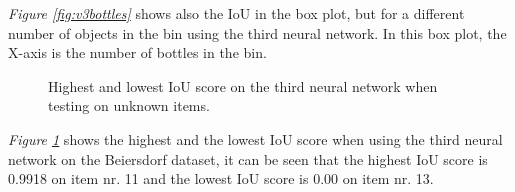 \textit{Figure \ref{fig:v3bottles}} shows also the IoU in the box plot, but for a different number of objects in the bin using the third neural network. In this box plot, the X-axis is the number of bottles in the bin. %
\clearpage
\begin{figure}[h]
 \centering
 \hfill
 
 \caption{Highest and lowest IoU score on the third neural network when testing on unknown items.}
 \label{fig:v3unknowniou2}
\end{figure}


\textit{Figure \ref{fig:v3unknowniou2}} shows the highest and the lowest IoU score when using the third neural network on the Beiersdorf dataset, it can be seen that the highest IoU score is 0.9918 on item nr. 11 and the lowest IoU score is 0.00 on item nr. 13.

